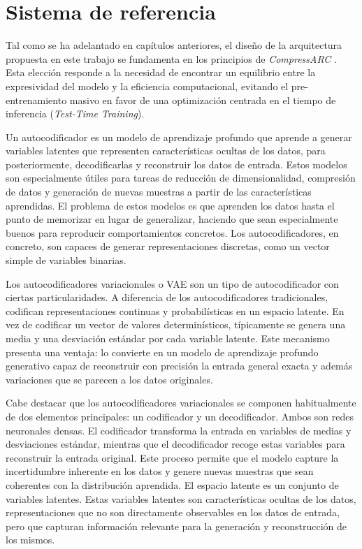 \documentclass[11pt,a4paper,spanish]{book}
\numberwithin{equation}{chapter}
\numberwithin{figure}{chapter}
\begin{document}
\FloatBarrier


	
\section{Sistema de referencia}

Tal como se ha adelantado en capítulos anteriores, el diseño de la arquitectura propuesta en este trabajo se 
fundamenta en los principios de \textit{CompressARC} \cite{liao2025arcagiwithoutpretraining}. Esta elección responde a la necesidad de encontrar 
un equilibrio entre la expresividad del modelo y la eficiencia computacional, evitando el pre-entrenamiento masivo en favor de una optimización centrada en 
el tiempo de inferencia (\textit{Test-Time Training}). 

Un autocodificador es un modelo de aprendizaje profundo que aprende a generar variables latentes que representen
características ocultas de los datos, para posteriormente, decodificarlas y reconstruir los datos de entrada. Estos modelos
son especialmente útiles para tareas de reducción de dimensionalidad, compresión de datos y generación de nuevas muestras a partir de las características aprendidas.
El problema de estos modelos es que aprenden los datos hasta el punto de memorizar en lugar de generalizar, 
haciendo que sean especialmente buenos para reproducir comportamientos concretos. Los autocodificadores, en concreto,
son capaces de generar representaciones discretas, como un vector simple de variables binarias.

Los autocodificadores variacionales o VAE son un tipo de autocodificador con ciertas particularidades. A diferencia de los
autocodificadores tradicionales, codifican representaciones continuas y probabilísticas en un espacio latente. En vez de codificar
un vector de valores determinísticos, típicamente se genera una media y una desviación estándar por cada variable latente.
Este mecanismo presenta una ventaja: lo convierte en un modelo de aprendizaje profundo generativo capaz de reconstruir con
precisión la entrada general exacta y además variaciones que se parecen a los datos originales.

Cabe destacar que los autocodificadores variacionales se componen habitualmente de dos elementos principales:
un codificador y un decodificador. Ambos son redes neuronales densas. El codificador transforma la entrada
en variables de medias y desviaciones estándar, mientras que el decodificador recoge estas variables para reconstruir 
la entrada original. Este proceso permite que el modelo capture la incertidumbre inherente en los datos y genere nuevas muestras que sean coherentes con la distribución aprendida.
El espacio latente es un conjunto de variables latentes. Estas variables latentes son características ocultas de los datos, representaciones
que no son directamente observables en los datos de entrada, pero que capturan información relevante para la generación y reconstrucción de los mismos.
\end{document}
